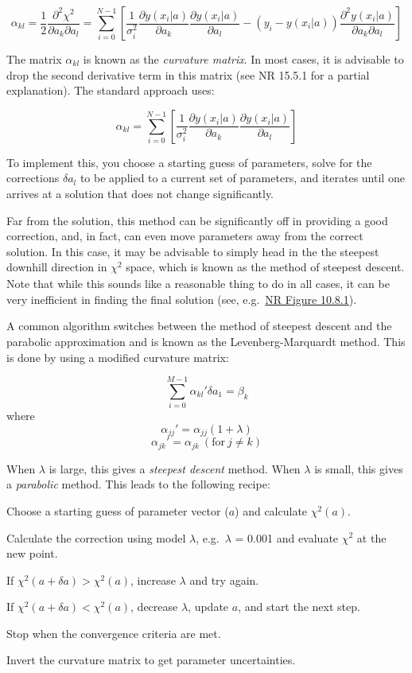 \documentclass[12pt]{article}
\begin{document}
$$ \alpha_{kl} = \frac{1}{2}\frac{\partial^2\chi^2}{\partial a_k\partial a_l} =
\sum_{i=0}^{N-1}\left[\frac{1}{\sigma_i^2}\frac{\partial y(x_i|a)}{\partial a_k}
    \frac{\partial y(x_i|a)}{\partial a_l} -
    (y_i-y(x_i|a))\frac{\partial^2y(x_i|a)}{\partial{a_k}\partial{a_l}} \right] $$

The matrix $\alpha_{kl}$ is known as the \emph{curvature matrix}. In most
cases, it is advisable to drop the second derivative term in this matrix
(see NR 15.5.1 for a partial explanation). The standard approach uses:

$$ \alpha_{kl} = \sum_{i=0}^{N-1}\left[\frac{1}{\sigma_i^2}
\frac{\partial{y}(x_i|a)}{\partial{a_k}}
\frac{\partial{y}(x_i|a)}{\partial{a_l}} \right] $$

To implement this, you choose a starting guess of parameters, solve
for the corrections  $\delta a_l$ to be applied to a current set of
parameters, and iterates until one arrives at a solution that does not
change significantly.

Far from the solution, this method can be significantly off in
providing a good correction, and, in fact, can even move parameters
away from the correct solution. In this case, it may be advisable to
simply head in the the steepest downhill direction in $ \chi^{2}_{}$
space, which is known as the method of steepest descent. Note that
while this sounds like a reasonable thing to do in all cases, it can
be very inefficient in finding the final solution
(see, e.g.\ \href{http://astronomy.nmsu.edu/holtz/a575/images/NR10.8.1.png}
{NR Figure 10.8.1}).

A common algorithm switches between the method of steepest descent and
the parabolic approximation and is known as the Levenberg-Marquardt
method. This is done by using a modified curvature matrix:

$$ \sum_{i=0}^{M-1} \alpha_{kl}'\delta{a_1} = \beta_{k} $$
where
$$ \alpha_{jj}' = \alpha_{jj}(1+\lambda) $$
$$ \alpha_{jk}' = \alpha_{jk}\ (\textrm{for}\ j \neq k) $$

When $\lambda$ is large, this gives a \emph{steepest descent} method.
When $\lambda$ is small, this gives a \emph{parabolic} method.
This leads to the following recipe:
\begin{enumerate*}
    \item Choose a starting guess of parameter vector ($a$) and
        calculate $\chi^2(a)$.
    \item Calculate the correction using model $\lambda$,
        e.g.\ $\lambda$ = 0.001 and evaluate $\chi^2$ at the new point.
    \item If $\chi^2(a + \delta a) > \chi^2(a)$, increase $\lambda$ and try again.
    \item If $\chi^2(a + \delta a) < \chi^2(a)$, decrease $\lambda$,
        update $a$, and start the next step.
    \item Stop when the convergence criteria are met.
    \item Invert the curvature matrix to get parameter uncertainties.
\end{enumerate*}
\end{document}
